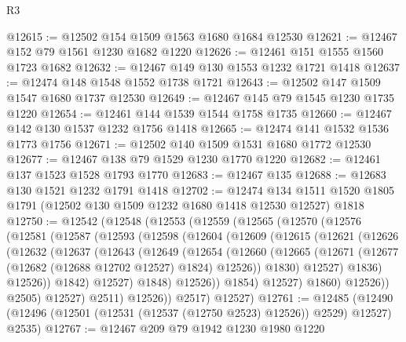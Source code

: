 \begin{lexlean}{R3}
\begin{coremodule}
@12615 := @12502 @154 @1509 @1563 @1680 @1684 @12530
@12621 := @12467 @152 @79 @1561 @1230 @1682 @1220
@12626 := @12461 @151 @1555 @1560 @1723 @1682
@12632 := @12467 @149 @130 @1553 @1232 @1721 @1418
@12637 := @12474 @148 @1548 @1552 @1738 @1721
@12643 := @12502 @147 @1509 @1547 @1680 @1737 @12530
@12649 := @12467 @145 @79 @1545 @1230 @1735 @1220
@12654 := @12461 @144 @1539 @1544 @1758 @1735
@12660 := @12467 @142 @130 @1537 @1232 @1756 @1418
@12665 := @12474 @141 @1532 @1536 @1773 @1756
@12671 := @12502 @140 @1509 @1531 @1680 @1772 @12530
@12677 := @12467 @138 @79 @1529 @1230 @1770 @1220
@12682 := @12461 @137 @1523 @1528 @1793 @1770
@12683 := @12467 @135
@12688 := @12683 @130 @1521 @1232 @1791 @1418
@12702 := @12474
    @134
    @1511
    @1520
    @1805
    @1791
    (@12502 @130 @1509 @1232 @1680 @1418 @12530 @12527)
    @1818
@12750 := @12542
    (@12548
      (@12553
        (@12559
          (@12565
            (@12570
              (@12576
                (@12581
                  (@12587
                    (@12593
                      (@12598
                        (@12604
                          (@12609
                            (@12615
                              (@12621
                                (@12626
                                  (@12632
                                    (@12637
                                      (@12643
                                        (@12649
                                          (@12654
                                            (@12660
                                              (@12665
                                                (@12671
                                                  (@12677
                                                    (@12682 (@12688 @12702 @12527) @1824)
                                                    @12526))
                                                @1830)
                                              @12527)
                                            @1836)
                                          @12526))
                                      @1842)
                                    @12527)
                                  @1848)
                                @12526))
                            @1854)
                          @12527)
                        @1860)
                      @12526))
                  @2505)
                @12527)
              @2511)
            @12526))
        @2517)
      @12527)
@12761 := @12485
    (@12490 (@12496 (@12501 (@12531 (@12537 (@12750 @2523) @12526)) @2529) @12527) @2535)
@12767 := @12467 @209 @79 @1942 @1230 @1980 @1220

\end{coremodule}
\end{lexlean}
